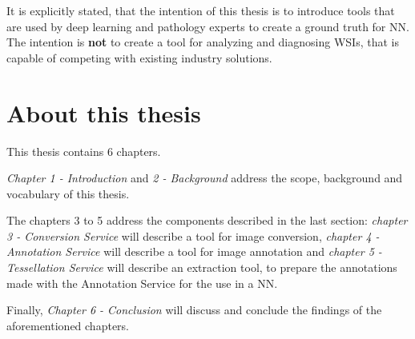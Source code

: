 It is explicitly stated, that the intention of this thesis is to introduce tools that are used by deep learning and pathology experts to create a ground truth for NN. The intention is \textbf{not} to create a tool for analyzing and diagnosing WSIs, that is capable of competing with existing industry solutions.


\section{About this thesis}
This thesis contains 6 chapters.

\emph{Chapter 1 - Introduction} and \emph{2 - Background} address the scope, background and vocabulary of this thesis.

The chapters 3 to 5 address the components described in the last section: \emph{chapter 3 - Conversion Service} will describe a tool for image conversion, \emph{chapter 4 - Annotation Service} will describe a tool for image annotation and \emph{chapter 5 - Tessellation Service} will describe an extraction tool, to prepare the annotations made with the Annotation Service for the use in a NN.

Finally, \emph{Chapter 6 - Conclusion} will discuss and conclude the findings of the aforementioned chapters.